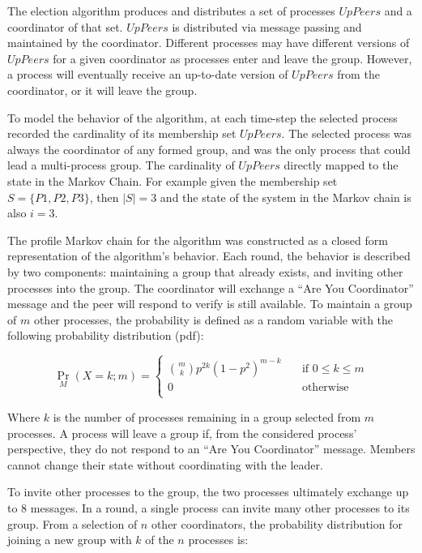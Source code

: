 The election algorithm produces and distributes a set of processes $UpPeers$ and a coordinator of that set.
$UpPeers$ is distributed via message passing and maintained by the coordinator.
Different processes may have different versions of $UpPeers$ for a given coordinator as processes enter and leave the group.
However, a process will eventually receive an up-to-date version of $UpPeers$ from the coordinator, or it will leave the group.

To model the behavior of the algorithm, at each time-step the selected process recorded the cardinality of its membership set $UpPeers$.
The selected process was always the coordinator of any formed group, and was the only process that could lead a multi-process group.
The cardinality of $UpPeers$ directly mapped to the state in the Markov Chain.
For example given the membership set $S=\{P1,P2,P3\}$, then $\left | S \right |=3$ and the state of the system in the Markov chain is also $i=3$.

The profile Markov chain for the algorithm was constructed as a closed form representation of the algorithm's behavior.
Each round, the behavior is described by two components: maintaining a group that already exists, and inviting other processes into the group.
The coordinator will exchange a ``Are You Coordinator'' message and the peer will respond to verify is still available.
To maintain a group of $m$ other processes, the probability is defined as a random variable with the following probability distribution (pdf):

\[
 \Pr_{M}(X=k; m) =
   \begin{cases}
    \binom{m}{k} p^{2k}(1-p^2)^{m-k} & \quad \text{if } 0 \leq k \leq m \\
    0                                & \quad \text{otherwise} \\
  \end{cases}
\]

Where $k$ is the number of processes remaining in a group selected from $m$ processes.
A process will leave a group if, from the considered process' perspective, they do not respond to an ``Are You Coordinator'' message.
Members cannot change their state without coordinating with the leader.

To invite other processes to the group, the two processes ultimately exchange up to 8 messages.
In a round, a single process can invite many other processes to its group.
From a selection of $n$ other coordinators, the probability distribution for joining a new group with $k$ of the $n$ processes is:


